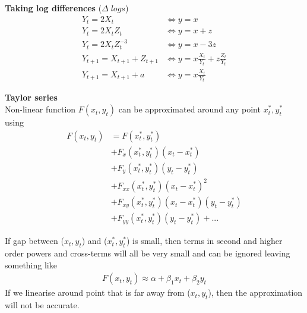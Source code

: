 \documentclass{beamer}
\begin{document}
\begin{frame}
 \textbf{Taking log differences} ($\Delta\;logs$)
 \begin{align*}
   Y_t = 2X_t &\Leftrightarrow y=x\\
   Y_t = 2X_tZ_t &\Leftrightarrow y=x+z\\
   Y_t=2X_tZ_t^{-3} &\Leftrightarrow y=x-3z\\
   Y_{t+1} = X_{t+1} +Z_{t+1} &\Leftrightarrow y=x\frac{X_t}{Y_t}+z\frac{Z_t}{Y_t}\\
   Y_{t+1} = X_{t+1} + a &\Leftrightarrow y=x\frac{X_t}{Y_t}
 \end{align*}
\end{frame}


\begin{frame}
  \textbf{Taylor series}\\
   Non-linear function $F(x_t,y_t)$ can be approximated around any point $x^*_t,y^*_t$ using
  \begin{align}
   F(x_t,y_t) &= F(x_t^*,y^*_t)\\ \nonumber
   &+ F_x(x^*_t,y^*_t)(x_t-x^*_t) \\ \nonumber
   &+ F_y(x^*_t,y^*_t)(y_t-y^*_t)\\ \nonumber
   &+ F_{xx}(x^*_t,y^*_t)(x_t- x^*_t)^2\\ \nonumber
   &+ F_{xy}(x^*_t,y^*_t)(x_t−x^*_t) (y_t-y^*_t)\\ \nonumber
   &+ F_{yy}(x^*_t,y^*_t) (y_t-y^*_t) +...
 \end{align}
\end{frame}

\begin{frame}
  If gap between ($x_t,y_t$) and ($x^*_t,y^*_t$) is small, then terms in second and higher order powers and cross-terms will all be very small and can be ignored leaving something like
\begin{align}
  F(x_t,y_t)\approx \alpha+\beta_1x_t+\beta_2y_t
\end{align}
\medskip
If we linearise around point that is far away from ($x_t,y_t$), then the approximation will not be accurate.
\end{frame}
\end{document}
